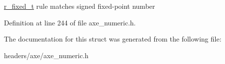 \hyperlink{structaxe_1_1r__fixed__t}{r\+\_\+fixed\+\_\+t} rule matches signed fixed-\/point number 

Definition at line 244 of file axe\+\_\+numeric.\+h.



The documentation for this struct was generated from the following file\+:\begin{DoxyCompactItemize}
\item 
headers/axe/axe\+\_\+numeric.\+h\end{DoxyCompactItemize}

